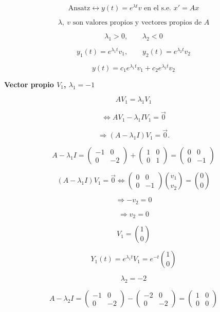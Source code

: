 ﻿\documentclass[11pt,letterpaper]{article}
\begin{document}
\[
\text{Ansatz} \leftrightarrow y(t)=e^{\lambda t}v \text{ en el s.e. } x'=Ax
\]

\[
\lambda,\ v \text{ son valores propios y vectores propios de } A
\]

\[
\lambda_1>0,\qquad \lambda_2<0
\]

\[
y_1(t)=e^{\lambda_1 t}v_1,\qquad y_2(t)=e^{\lambda_2 t}v_2
\]

\[
y(t)=c_1e^{\lambda_1 t}v_1+c_2e^{\lambda_2 t}v_2
\]

\medskip

\textbf{Vector propio \(V_1\), \(\lambda_1=-1\)}

\[
AV_1=\lambda_1 V_1
\]

\[
\Leftrightarrow AV_1-\lambda_1 I V_1=\vec{0}
\]

\[
\Rightarrow (A-\lambda_1 I)V_1=\vec{0}.
\]

\[
A-\lambda_1 I=
\begin{pmatrix}
-1 & 0\\
0 & -2
\end{pmatrix} +
\begin{pmatrix}
1 & 0\\
0 & 1
\end{pmatrix}
=
\begin{pmatrix}
0 & 0\\
0 & -1
\end{pmatrix}
\]

\[
(A-\lambda_1 I)V_1=\vec{0}
\Leftrightarrow
\begin{pmatrix}
0 & 0\\
0 & -1
\end{pmatrix}
\binom{v_1}{v_2}
=
\binom{0}{0}
\]

\[
\Rightarrow -v_2=0
\]

\[
\Rightarrow v_2=0
\]

\[
V_1=\binom{1}{0}
\]

\[
Y_1(t)=e^{\lambda_1 t}V_1=e^{-t}\binom{1}{0}
\]

\[
\lambda_2=-2
\]

\[
A-\lambda_2 I=
\begin{pmatrix}
-1 & 0\\
0 & -2
\end{pmatrix}
-
\begin{pmatrix}
-2 & 0\\
0 & -2
\end{pmatrix}
=
\begin{pmatrix}
1 & 0\\
0 & 0
\end{pmatrix}
\]
\end{document}
